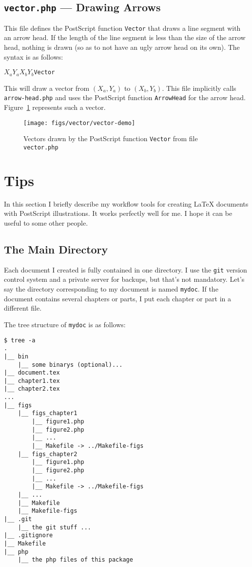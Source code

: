 \documentclass[10pt,a4paper]{scrartcl}
\newcommand\PS{PostScript}
\begin{document}
\subsection{\texttt{vector.php} --- Drawing Arrows}
\label{ssec:vector.php}
This file defines the \PS{} function \texttt{Vector} that draws a line segment
with an arrow head. If the length of the line segment is less than the size
of the arrow head, nothing is drawn (so as to not have an ugly arrow head on its own).
The syntax is as follows:
\begin{center}
$X_a$\quad$Y_a$\quad$X_b$\quad$Y_b$\quad\texttt{Vector}
\end{center}
This will draw a vector from $(X_a,Y_a)$ to $(X_b,Y_b)$. This file implicitly calls
\texttt{arrow-head.php} and uses the \PS{} function \texttt{ArrowHead} for the arrow head.
Figure~\ref{fig:vector-demo} represents such a vector.
\begin{figure}[ht!]%
\centering
\texttt{[image: figs/vector/vector-demo]}%
\caption{Vectors drawn by the \PS{} function \texttt{Vector} from file \texttt{vector.php}}%
\label{fig:vector-demo}%
\end{figure}

\section{Tips}
In this section I briefly describe my workflow tools for creating \LaTeX{}
documents with \PS{} illustrations. It works perfectly well for me. I hope it can
be useful to some other people.
\subsection{The Main Directory}
Each document I created is fully contained in one directory. I use the
\texttt{git} version control system and a private server for backups, but
that's not mandatory. Let's say the directory corresponding to my document
is named \texttt{mydoc}. If the document contains several chapters or parts,
I put each chapter or part in a different file.

The tree structure of \texttt{mydoc} is as follows:
\begin{lstlisting}
$ tree -a
.
|__ bin
    |__ some binarys (optional)...
|__ document.tex
|__ chapter1.tex
|__ chapter2.tex
...
|__ figs
    |__ figs_chapter1
        |__ figure1.php
        |__ figure2.php
        |__ ...
        |__ Makefile -> ../Makefile-figs
    |__ figs_chapter2
        |__ figure1.php
        |__ figure2.php
        |__ ...
        |__ Makefile -> ../Makefile-figs
    |__ ...
    |__ Makefile
    |__ Makefile-figs
|__ .git
    |__ the git stuff ...
|__ .gitignore
|__ Makefile
|__ php
    |__ the php files of this package
\end{lstlisting}
\end{document}
